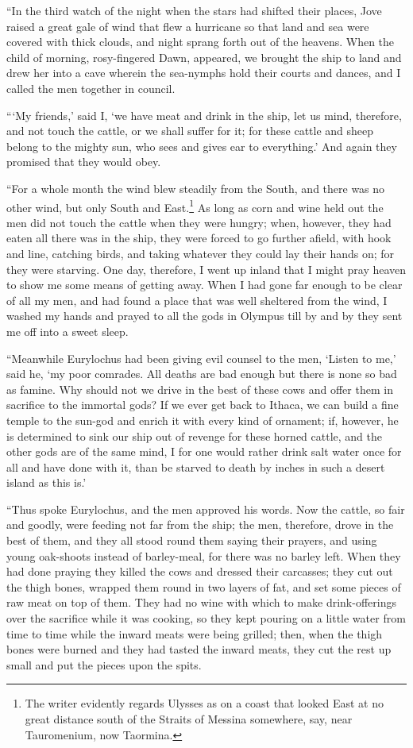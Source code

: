 “In the third watch of the night when the stars had shifted their places, Jove
raised a great gale of wind that flew a hurricane so that land and sea were
covered with thick clouds, and night sprang forth out of the heavens. When the
child of morning, rosy-fingered Dawn, appeared, we brought the ship to land and
drew her into a cave wherein the sea-nymphs hold their courts and dances, and I
called the men together in council.

“‘My friends,’ said I, ‘we have meat and drink in the ship, let us mind,
therefore, and not touch the cattle, or we shall suffer for it; for these
cattle and sheep belong to the mighty sun, who sees and gives ear to
everything.’ And again they promised that they would obey.

“For a whole month the wind blew steadily from the South, and there was no
other wind, but only South and East.\footnote{The writer evidently regards Ulysses as on a coast that looked East at no
great distance south of the Straits of Messina somewhere, say, near
Tauromenium, now Taormina.} As long as corn and wine held out
the men did not touch the cattle when they were hungry; when, however, they had
eaten all there was in the ship, they were forced to go further afield, with
hook and line, catching birds, and taking whatever they could lay their hands
on; for they were starving. One day, therefore, I went up inland that I might
pray heaven to show me some means of getting away. When I had gone far enough
to be clear of all my men, and had found a place that was well sheltered from
the wind, I washed my hands and prayed to all the gods in Olympus till by and
by they sent me off into a sweet sleep.

“Meanwhile Eurylochus had been giving evil counsel to the men, ‘Listen to me,’
said he, ‘my poor comrades. All deaths are bad enough but there is none so bad
as famine. Why should not we drive in the best of these cows and offer them in
sacrifice to the immortal gods? If we ever get back to Ithaca, we can build a
fine temple to the sun-god and enrich it with every kind of ornament; if,
however, he is determined to sink our ship out of revenge for these horned
cattle, and the other gods are of the same mind, I for one would rather drink
salt water once for all and have done with it, than be starved to death by
inches in such a desert island as this is.’

“Thus spoke Eurylochus, and the men approved his words. Now the cattle, so fair
and goodly, were feeding not far from the ship; the men, therefore, drove in
the best of them, and they all stood round them saying their prayers, and using
young oak-shoots instead of barley-meal, for there was no barley left. When
they had done praying they killed the cows and dressed their carcasses; they
cut out the thigh bones, wrapped them round in two layers of fat, and set some
pieces of raw meat on top of them. They had no wine with which to make
drink-offerings over the sacrifice while it was cooking, so they kept pouring
on a little water from time to time while the inward meats were being grilled;
then, when the thigh bones were burned and they had tasted the inward meats,
they cut the rest up small and put the pieces upon the spits.

